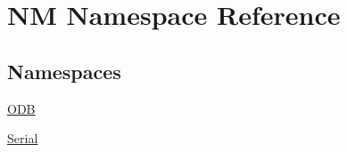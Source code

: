 \hypertarget{namespace_n_m}{}\section{N\+M Namespace Reference}
\label{namespace_n_m}
\subsection*{Namespaces}
\begin{DoxyCompactItemize}
\item 
 \hyperlink{namespace_n_m_1_1_o_d_b}{O\+D\+B}
\item 
 \hyperlink{namespace_n_m_1_1_serial}{Serial}
\end{DoxyCompactItemize}
